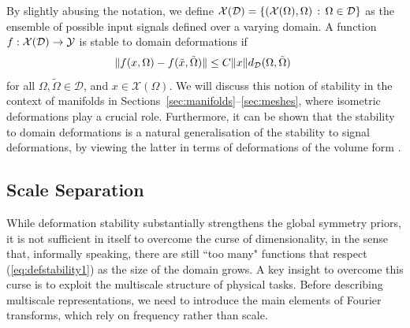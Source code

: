 By slightly abusing the notation, we define ${\mathcal{X}}(\mathcal{D}) = \{ ({\mathcal{X}}(\Omega), \Omega) \, : \, \Omega \in \mathcal{D} \}$ as the ensemble of possible input signals defined over a varying domain. 
A function $f : {\mathcal{X}}(\mathcal{D}) \to {\mathcal{Y}}$ is stable to domain deformations if 
\begin{equation}
\| f( x, \Omega) - f(\tilde{x}, \tilde{\Omega}) \| \leq C \|x \| d_{{\mathcal{D}}}(\Omega, \tilde{\Omega})~
\label{eqn:domain_def_stability}
\end{equation}
%
for all $\Omega, \tilde{\Omega} \in \mathcal{D}$, and  $x \in \mathcal{X}(\Omega)$. 
%
We will discuss this notion of stability in the context of manifolds in Sections~\ref{sec:manifolds}--\ref{sec:meshes}, where isometric deformations play a crucial role.
Furthermore, it can be shown that the stability to domain deformations is a natural generalisation of the stability to signal deformations, by viewing the latter in terms of deformations of the volume form \cite{gama2019diffusion}. 





\subsection{Scale Separation}
\label{sec:scale_separation}

While deformation stability substantially strengthens the global symmetry priors, it is not sufficient in itself to overcome the curse of dimensionality, in the sense that, informally speaking, there are still ``too many" functions that respect (\ref{eq:defstability1}) as the size of the domain grows. A key insight to overcome this curse is to exploit the multiscale structure of physical tasks. Before describing multiscale representations, we need to introduce the main elements of Fourier transforms, which rely on frequency rather than scale. 

